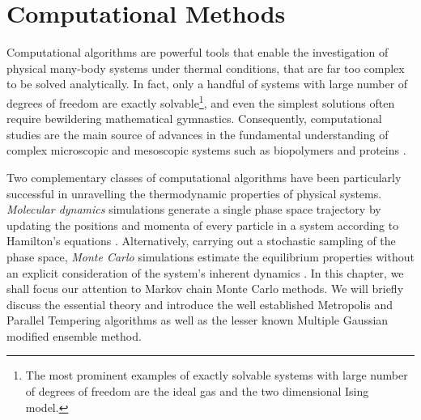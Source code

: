 \documentclass[12pt]{report}
\begin{document}

\chapter{Computational Methods}
\label{chap:compMethods}

Computational algorithms are powerful tools that enable the investigation of physical many-body systems under thermal conditions, that are far too complex to be solved analytically. In fact, only a handful of systems with large number of degrees of freedom are exactly solvable\footnote{The most prominent examples of exactly solvable systems with large number of degrees of freedom are the ideal gas and the two dimensional Ising model.}, and even the simplest solutions often require bewildering mathematical gymnastics. Consequently, computational studies are the main source of advances in the fundamental understanding of complex microscopic and mesoscopic systems such as biopolymers and proteins \cite{Bachmann2014}.

Two complementary classes of computational algorithms have been particularly successful in unravelling the thermodynamic properties of physical systems. \textit{Molecular dynamics} simulations generate a single phase space trajectory by updating the positions and momenta of every particle in a system according to Hamilton's equations \cite{Rapaport2004,Tuckerman2010}. Alternatively, carrying out a stochastic sampling of the phase space, \textit{Monte Carlo} simulations estimate the equilibrium properties without an explicit consideration of the system's inherent dynamics \cite{Bachmann2014, Landau2000}. In this chapter, we shall focus our attention to Markov chain Monte Carlo methods. We will briefly discuss the essential theory and introduce the well established Metropolis and Parallel Tempering algorithms as well as the lesser known Multiple Gaussian modified ensemble method.


\end{document}
